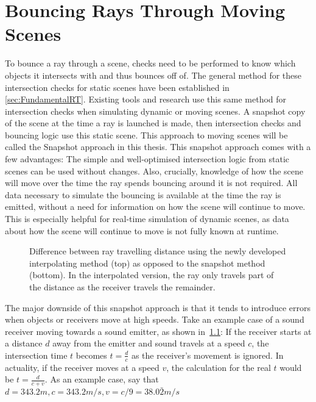 \chapter{Bouncing Rays Through Moving Scenes}\label{ch:Intersection}

To bounce a ray through a scene, checks need to be performed to know which objects it intersects with and thus bounces off of.
The general method for these intersection checks for static scenes have been established in \autoref{sec:FundamentalRT}.
Existing tools and research use this same method for intersection checks when simulating dynamic or moving scenes.
A snapshot copy of the scene at the time a ray is launched is made,
then intersection checks and bouncing logic use this static scene.
This approach to moving scenes will be called the Snapshot approach in this thesis.
\newline
This snapshot approach comes with a few advantages:
The simple and well-optimised intersection logic from static scenes can be used without changes.
Also, crucially, knowledge of how the scene will move over the time the ray spends bouncing around it is not required.
All data necessary to simulate the bouncing is available at the time the ray is emitted,
without a need for information on how the scene will continue to move.
This is especially helpful for real-time simulation of dynamic scenes, as data about how the scene will continue to move is not
fully known at runtime.
\newline
\begin{figure}[t!]
    
    \caption{Difference between ray travelling distance using the newly developed interpolating method (top) as opposed to the snapshot method (bottom). In the interpolated version, the ray only travels part of the distance as the receiver travels the remainder.}\label{im:SnapshotExplain}
\end{figure}
The major downside of this snapshot approach is that it tends to introduce errors when objects or receivers move at high speeds.
Take an example case of a sound receiver moving towards a sound emitter, as shown in~\ref{im:SnapshotExplain}:
If the receiver starts at a distance \(d\) away from the emitter and sound travels at a speed \(c\),
the intersection time \(t\) becomes \(t = \frac{d}{c}\) as the receiver's movement is ignored.
In actuality, if the receiver moves at a speed \(v\), the calculation for the real \(t\) would be \(t = \frac{d}{c+v}\).
\newline
As an example case, say that \(d = 343.2m, c = 343.2 m/s, v = c/9 = 38.0\bar{2} m/s\)
